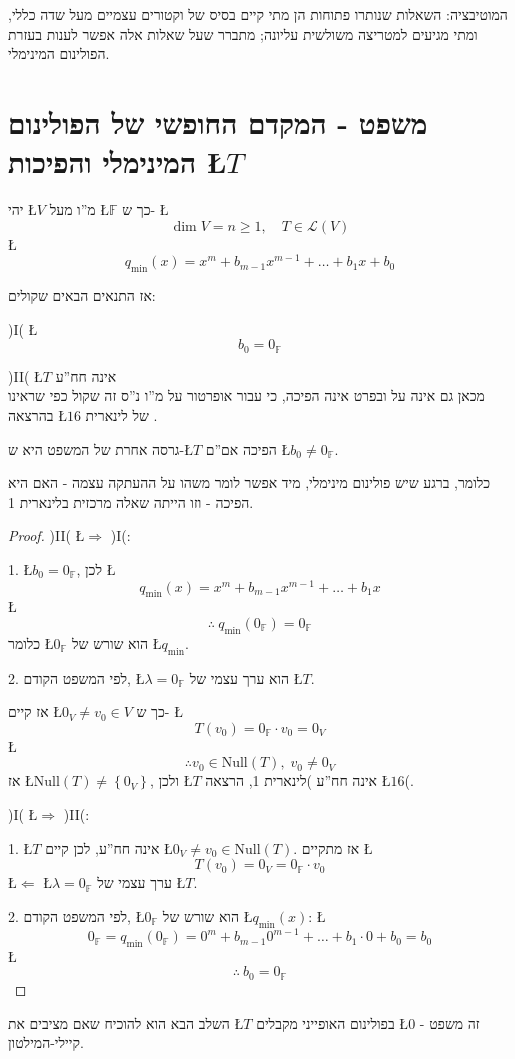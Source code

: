 \documentclass[english,hebrew]{article}
\begin{document}
המוטיבציה: השאלות שנותרו פתוחות הן מתי קיים בסיס של וקטורים עצמיים
מעל שדה כללי, ומתי מגיעים למטריצה משולשית עליונה; מתברר שעל שאלות
אלה אפשר לענות בעזרת הפולינום המינימלי.

\section{משפט - המקדם החופשי של הפולינום המינימלי והפיכות \L{$T$}}

יהי \L{$V$} מ\textquotedblright ו מעל \L{$\mathbb{F}$} כך ש- \L{%
\[
\dim V=n\geq1,\quad T\in\mathcal{L}(V)
\]
}%
\L{%
\[
q_{\min}(x)=x^{m}+b_{m-1}x^{m-1}+\dots+b_{1}x+b_{0}
\]
}%

אז התנאים הבאים שקולים:

)I( \L{%
\[
b_{0}=0_{\mathbb{F}}
\]
}%

)II( \L{$T$} אינה חח\textquotedblright ע\\

מכאן גם אינה על ובפרט אינה הפיכה, כי עבור אופרטור על מ\textquotedblright ו
נ\textquotedblright ס זה שקול כפי שראינו בהרצאה {\beginL \L{$16$}\endL}
של לינארית {\endL}.

גרסה אחרת של המשפט היא ש-\L{$T$} הפיכה אם\textquotedblright ם \L{$b_{0}\neq0_{\mathbb{F}}$}.

כלומר, ברגע שיש פולינום מינימלי, מיד אפשר לומר משהו על ההעתקה עצמה
- האם היא הפיכה - וזו הייתה שאלה מרכזית בלינארית 1.
\begin{proof}
)II( \L{$\Rightarrow$} )I(:

1. \L{$b_{0}=0_{\mathbb{F}}$}, לכן \L{%
\[
q_{\min}(x)=x^{m}+b_{m-1}x^{m-1}+\dots+b_{1}x
\]
}%
\L{%
\[
\therefore\ q_{\min}(0_{\mathbb{F}})=0_{\mathbb{F}}
\]
}%
כלומר \L{$0_{\mathbb{F}}$} הוא שורש של \L{$q_{\min}$}.

2. לפי המשפט הקודם, \L{$\lambda=0_{\mathbb{F}}$} הוא ערך עצמי של
\L{$T$}.

אז קיים \L{$0_{V}\ne v_{0}\in V$} כך ש- \L{%
\[
T(v_{0})=0_{\mathbb{F}}\cdot v_{0}=0_{V}
\]
}%
\L{%
\[
\therefore v_{0}\in\text{Null}(T),\;v_{0}\neq0_{V}
\]
}%
אז \L{$\text{Null}(T)\neq\left\{ 0_{V}\right\} $}, ולכן \L{$T$}
אינה חח\textquotedblright ע )לינארית 1, הרצאה \L{$16$}(.

)I( \L{$\Rightarrow$} )II(:

1. \L{$T$} אינה חח\textquotedblright ע, לכן קיים \L{$0_{V}\ne v_{0}\in\text{Null}(T)$}.
אז מתקיים \L{%
\[
T(v_{0})=0_{V}=0_{\mathbb{F}}\cdot v_{0}
\]
}%
\L{$\Leftarrow$} \L{$\lambda=0_{\mathbb{F}}$} ערך עצמי של \L{$T$}.

2. לפי המשפט הקודם, \L{$0_{\mathbb{F}}$} הוא שורש של \L{$q_{\min}(x)$}:
\L{%
\[
0_{\mathbb{F}}=q_{\min}(0_{\mathbb{F}})=0^{m}+b_{m-1}0^{m-1}+\dots+b_{1}\cdot0+b_{0}=b_{0}
\]
}%
\L{%
\[
\therefore\ b_{0}=0_{\mathbb{F}}
\]
}%
\end{proof}
השלב הבא הוא להוכיח שאם מציבים את \L{$T$} בפולינום האופייני מקבלים
\L{$0$} - זה משפט קיילי-המילטון.
\end{document}
